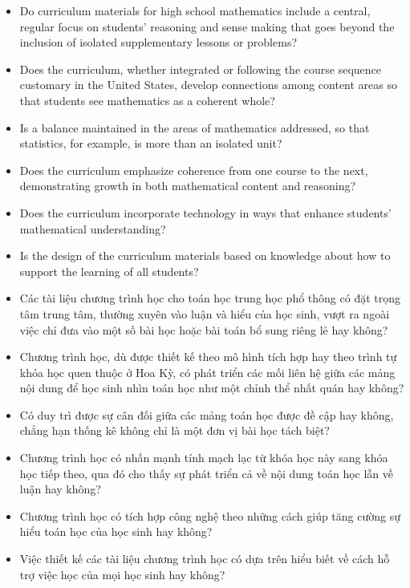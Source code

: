 \documentclass[
  10pt,
  a4paper,
  landscape,
  twoside,
  openany
]{scrbook}
\newcommand{\EN}[1]{#1}
\newcounter{example}
\begin{document}
\TriPara
{
\EN{
  \begin{itemize}
    \item Do curriculum materials for high school mathematics include a central, regular focus on students' reasoning and sense making that goes beyond the inclusion of isolated supplementary lessons or problems?
    \item Does the curriculum, whether integrated or following the course sequence customary in the United States, develop connections among content areas so that students see mathematics as a coherent whole?
    \item Is a balance maintained in the areas of mathematics addressed, so that statistics, for example, is more than an isolated unit?
    \item Does the curriculum emphasize coherence from one course to the next, demonstrating growth in both mathematical content and reasoning?
    \item Does the curriculum incorporate technology in ways that enhance students' mathematical understanding?
    \item Is the design of the curriculum materials based on knowledge about how to support the learning of all students?
  \end{itemize}}
}
{
\EN{
  \begin{itemize}
    \item Các tài liệu chương trình học cho toán học trung học phổ thông có đặt trọng tâm trung tâm, thường xuyên vào luận và hiểu của học sinh, vượt ra ngoài việc chỉ đưa vào một số bài học hoặc bài toán bổ sung riêng lẻ hay không?
    \item Chương trình học, dù được thiết kế theo mô hình tích hợp hay theo trình tự khóa học quen thuộc ở Hoa Kỳ, có phát triển các mối liên hệ giữa các mảng nội dung để học sinh nhìn toán học như một chỉnh thể nhất quán hay không?
    \item Có duy trì được sự cân đối giữa các mảng toán học được đề cập hay không, chẳng hạn thống kê không chỉ là một đơn vị bài học tách biệt?
    \item Chương trình học có nhấn mạnh tính mạch lạc từ khóa học này sang khóa học tiếp theo, qua đó cho thấy sự phát triển cả về nội dung toán học lẫn về luận hay không?
    \item Chương trình học có tích hợp công nghệ theo những cách giúp tăng cường sự hiểu toán học của học sinh hay không?
    \item Việc thiết kế các tài liệu chương trình học có dựa trên hiểu biết về cách hỗ trợ việc học của mọi học sinh hay không?
  \end{itemize}}
}
\end{document}
